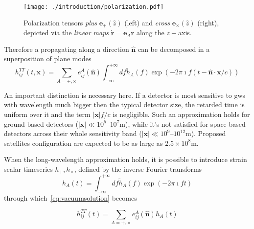 \begin{figure}[h]
	\begin{centering}
		\texttt{[image: ./introduction/polarization.pdf]}
		\par\end{centering}
	\caption[Polarization tensor basis of a propagating gravitational wave]{Polarization tensors \emph{plus} $\boldsymbol{e}_{+}\left(\hat{z}\right)$
		(left) and \emph{cross} $\boldsymbol{e}_{\times}(\hat{z})$ (right),
		depicted via the \emph{linear maps} $\dot{\boldsymbol{r}}=\boldsymbol{e}_{A}\boldsymbol{r}$
		along the $z-$axis.}
\end{figure}

Therefore a \gw propagating along a direction $\hat{\boldsymbol{n}}$ can be decomposed in a superposition of plane modes
\begin{equation}
		h_{ij}^{TT}\left(t,\boldsymbol{x}\right) =\sum_{A=+,\times}e^{A}_{ij}(\hat{\boldsymbol{n}}) \int_{-\infty}^{+\infty} df \tilde{h}_{A}(f)\exp(-2\pi\imath f(t-\hat{\boldsymbol{n}}\cdot\boldsymbol{x}/c))\label{eq:planewaves}
\end{equation} 

An important distinction is necessary here. If a detector is most sensitive to \acp{gw} with wavelength much bigger then the typical detector size, the retarded time is uniform over it and the term $|\boldsymbol{x}|f/c$ is negligible. Such an approximation holds for ground-based detectors ($|\boldsymbol{x}|\ll10^5\text{--}10^7\si{\meter}$), while it's not satisfied for space-based detectors across their whole sensitivity band ($|\boldsymbol{x}|\ll10^9\text{--}10^{12}\si{\meter}$). Proposed satellites configuration are expected to be as large as  $2.5\times10^8\si{\meter}$. 

When the long-wavelength approximation holds, it is possible to introduce strain scalar timeseries $h_+,h_\times$, defined by the inverse Fourier transforms
\begin{equation}
	h_A(t)=\int_{-\infty}^{+\infty} df \tilde{h}_A(f)\exp(-2\pi\imath ft)
\end{equation}
through which~\eqref{eq:vacuumsolution} becomes

\begin{equation}
	h_{ij}^{TT}(t) =\sum_{A=+,\times}e^{A}_{ij}(\hat{\boldsymbol{n}})h_A(t)
\end{equation} 